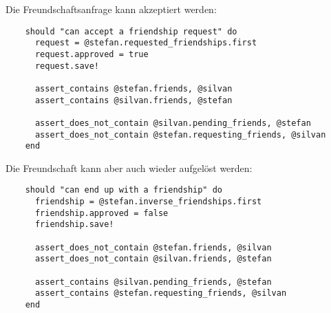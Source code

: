 Die Freundschaftsanfrage kann akzeptiert werden:

\begin{verbatim}
    should "can accept a friendship request" do
      request = @stefan.requested_friendships.first
      request.approved = true
      request.save!
      
      assert_contains @stefan.friends, @silvan
      assert_contains @silvan.friends, @stefan
      
      assert_does_not_contain @silvan.pending_friends, @stefan
      assert_does_not_contain @stefan.requesting_friends, @silvan
    end
\end{verbatim}

Die Freundschaft kann aber auch wieder aufgelöst werden:

\begin{verbatim}
    should "can end up with a friendship" do
      friendship = @stefan.inverse_friendships.first
      friendship.approved = false
      friendship.save!
      
      assert_does_not_contain @stefan.friends, @silvan
      assert_does_not_contain @silvan.friends, @stefan
      
      assert_contains @silvan.pending_friends, @stefan
      assert_contains @stefan.requesting_friends, @silvan 
    end
\end{verbatim}